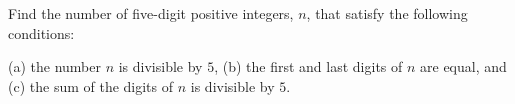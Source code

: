Find the number of five-digit positive integers, $n$, that satisfy the following conditions:

(a) the number $n$ is divisible by $5$,
(b) the first and last digits of $n$ are equal, and
(c) the sum of the digits of $n$ is divisible by $5$.